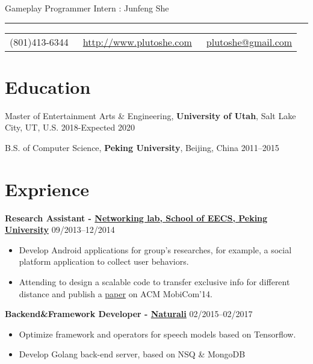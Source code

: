 \documentclass{article}
\begin{document}
	
	\color{text1} %
	
	\par{\centering
		{\sffamily\huge Gameplay Programmer Intern : Junfeng She
		}\\	
		{\color{headings} \par}
		{\color{white} \hrule} %
		
		\vspace{10pt}
		
		\colorbox{mygrey}{\textcolor{text1}{
				\begin{tabular}{c|c|c}
					\raisebox{-2pt}{\Phone} (801)413-6344 &
					\raisebox{-2pt}{\Envelope} ~\href{http://www.plutoshe.com}{http://www.plutoshe.com}	 &	 \raisebox{0pt}{\textbf{@}}
					~\href{mailto:plutoshe@gmail.com}{plutoshe@gmail.com}
				\end{tabular}
			}
		}
		\vspace{10pt}
		
		\section{Education}
		\vspace{5pt}
		Master of Entertainment Arts \& Engineering, \textbf{University of Utah}, Salt Lake City, UT, U.S. \hfill 2018-Expected 2020
		\vspace{5pt}
		
		B.S. of Computer Science, \textbf{Peking University}, Beijing, China \hfill 2011--2015
		\vspace{10pt}
		
		\section{Exprience}
		\textbf{Research Assistant - \href{http://net.pku.edu.cn/mobile/doku.php?id=eng:start}{Networking lab, School of EECS, Peking University}} \hfill 09/2013--12/2014
			\begin{itemize}
				\item Develop Android applications for group's researches, for example, a social platform application to collect user behaviors.
				\item Attending to design a scalable code to transfer exclusive info for different distance and publish a \href{https://www.eng.yale.edu/wenjun/papers/strata.pdf}{paper} on ACM MobiCom'14.
			\end{itemize}
		\textbf{Backend\&Framework Developer - \href{https://naturali.io}{Naturali}} \hfill 02/2015--02/2017
		\begin{itemize}
			\item Optimize framework and operators for speech models based on Tensorflow.
			\item Develop Golang back-end server, based on NSQ \& MongoDB
		\end{itemize}
		
}
\end{document}
